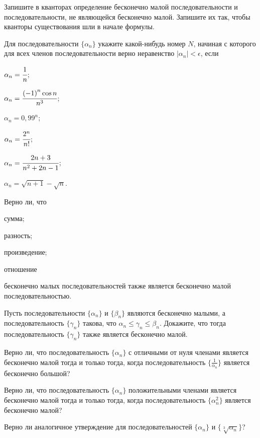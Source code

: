 \documentclass[a4paper, 12pt, num=25]{listok}
\begin{document}
\begin{problem}
	Запишите в кванторах определение бесконечно малой последовательности и последовательности, не являющейся бесконечно малой.
	Запишите их так, чтобы кванторы существования шли в начале формулы.
\end{problem}
\begin{problem}
	Для последовательности $\{\alpha_n\}$ укажите какой-нибудь номер $N$, начиная с которого для всех членов последовательности верно неравенство
	$|\alpha_n| < \epsilon$, если
	\begin{multienum}{3}
		\item $\alpha_n = \cfrac1n$;
		\item $\alpha_n = \cfrac{{(-1)}^n \cos n}{n^3}$;
		\item $\alpha_n = {0{,}99}^n$;
		\item $\alpha_n = \cfrac{2^n}{n!}$;
		\item $\alpha_n = \cfrac{2n+3}{n^2+2n-1}$;
		\item $\alpha_n = \sqrt{n + 1} - \sqrt n$.
	\end{multienum}
\end{problem}
\begin{problem}
	Верно ли, что
	\begin{probparts}
		\item сумма;
		\item разность;
		\item произведение;
		\item отношение
	\end{probparts}
	бесконечно малых последовательностей также является бесконечно малой последовательностью.
\end{problem}
\begin{problem}
	Пусть последовательности $\{\alpha_n\}$ и $\{\beta_n\}$ являются бесконечно малыми,
	а последовательность $\{\gamma_n\}$ такова, что $\alpha_n \le \gamma_n \le \beta_n$.
	Докажите, что тогда последовательность $\{\gamma_n\}$ также является бесконечно малой.
\end{problem}
\begin{problem}
	Верно ли, что последовательность $\{\alpha_n\}$ с отличными от нуля членами является бесконечно малой тогда и только тогда,
	когда последовательность $\{\frac1{\alpha_n}\}$ является бесконечно большой?
\end{problem}
\begin{problem}
\begin{probparts}
	\item Верно ли, что последовательность $\{\alpha_n\}$ положительными членами является бесконечно малой тогда и только тогда,
	когда последовательность $\{\alpha_n^2\}$ является бесконечно малой?
	\item Верно ли аналогичное утверждение для последовательностей $\{\alpha_n\}$ и $\{\sqrt[3]{\alpha_n}\}$?
\end{probparts}
\end{problem}
\end{document}
